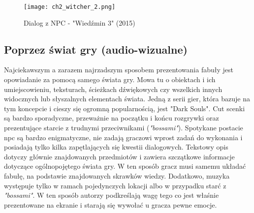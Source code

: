 \begin{figure}[h]
    \texttt{[image: ch2\_witcher\_2.png]}
    \caption{Dialog z NPC - "Wiedźmin 3" (2015)}
    \centering
    \label{fig:ch1_2_2_dialogue}
\end{figure}

\subsection{Poprzez świat gry (audio-wizualne)}

Najciekawszym a zarazem najrzadszym\cite{the_evolution_of_video_games} sposobem prezentowania fabuły
jest opowiadanie za pomocą samego świata gry. Mowa tu o obiektach i ich umiejscowieniu, teksturach,
ścieżkach dźwiękowych czy wszelkich innych widocznych lub słyszalnych elementach świata. Jedną z
serii gier, która bazuje na tym koncepcie i cieszy się ogromną popularnością, jest "Dark Souls".
Cut scenki są bardzo sporadyczne, przeważnie na początku i końcu rozgrywki oraz prezentujące starcie
z trudnymi przeciwnikami (\textit{"bossami"}). Spotykane postacie \gls{npc} są bardzo enigmatyczne, nie
zadają graczowi wprost zadań do wykonania i posiadają tylko kilka zapętlających się kwestii
dialogowych. Tekstowy opis dotyczy głównie znajdowanych przedmiotów i zawiera szczątkowe informacje
dotyczące ogólnopojętego świata gry. W ten sposób gracz musi samemu układać fabułę, na podstawie
znajdowanych skrawków wiedzy. Dodatkowo, muzyka występuje tylko w ramach pojedynczych lokacji albo
w przypadku starć z \textit{"bossami"}. W ten sposób autorzy podkreślają wagę tego co jest właśnie
prezentowane na ekranie i starają się wywołać u gracza pewne emocje.